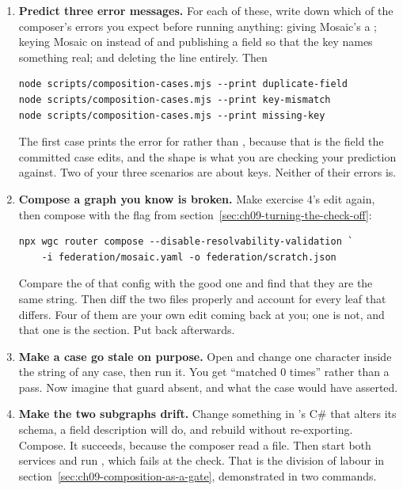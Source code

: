 \begin{enumerate}
  \item \textbf{Predict three error messages.} For each of these, write down
  which of the composer's errors you expect before running anything: giving
  Mosaic's  a ; keying Mosaic on 
  instead of  and publishing a  field so that the key names
  something real; and deleting the  line entirely. Then

  \begin{verbatim}
node scripts/composition-cases.mjs --print duplicate-field
node scripts/composition-cases.mjs --print key-mismatch
node scripts/composition-cases.mjs --print missing-key
  \end{verbatim}

  The first case prints the error for  rather than ,
  because that is the field the committed case edits, and the shape is what you
  are checking your prediction against. Two of your three scenarios are about
  keys. Neither of their errors is.

  \item \textbf{Compose a graph you know is broken.} Make exercise 4's edit
  again, then compose with the flag from
  section~\ref{sec:ch09-turning-the-check-off}:

  \begin{verbatim}
npx wgc router compose --disable-resolvability-validation `
    -i federation/mosaic.yaml -o federation/scratch.json
  \end{verbatim}

  Compare the  of that config with the good
  one and find that they are the same string. Then diff the two files properly
  and account for every leaf that differs. Four of them are your own edit coming
  back at you; one is not, and that one is the section. Put
   back afterwards.

  \item \textbf{Make a case go stale on purpose.} Open
   and change one character inside the
   string of any case, then run it. You get \enquote{matched 0 times}
  rather than a pass. Now imagine that guard absent, and what the case would
  have asserted.

  \item \textbf{Make the two subgraphs drift.} Change something in
  's C\# that alters its schema, a field description will
  do, and rebuild without re-exporting. Compose. It succeeds, because the
  composer read a file. Then start both services and run
  , which fails at the  check.
  That is the division of labour in
  section~\ref{sec:ch09-composition-as-a-gate}, demonstrated in two commands.


\end{enumerate}
